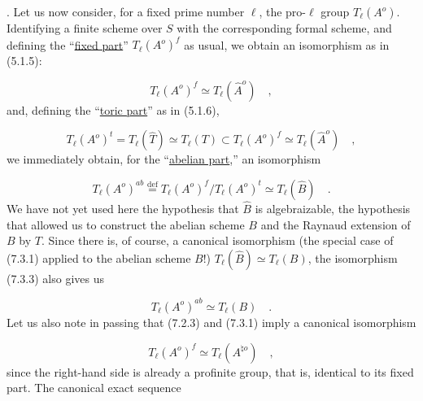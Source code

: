 
\medskip
{}. Let us now consider, for a fixed prime number $\ell$, the
pro-$\ell$ group $T_{\ell}(A^{o})$. Identifying a finite scheme over
$S$ with the corresponding formal scheme, and defining the
``\underline{fixed part}'' $T_{\ell}(A^{o})^{f}$ as usual, we obtain
an isomorphism as in (5.1.5):

\begin{equation}\tag{7.3.1}
T_{\ell}(A^{o})^{f} \simeq T_{\ell}(\widehat{A}^{o}) \quad ,
\end{equation}
and, defining the ``\underline{toric part}'' as in (5.1.6),

\begin{equation}\tag{7.3.2}
T_{\ell}(A^{o})^{t} = T_{\ell}(\widehat{T}) \simeq T_{\ell}(T)
 \subset T_{\ell}(A^{o})^{f} \simeq T_{\ell}(\widehat{A}^{o}) \quad ,
\end{equation}
we immediately obtain, for the ``\underline{abelian part},'' an
isomorphism

\begin{equation}\tag{7.3.3}
T_{\ell}(A^{o})^{ab} \stackrel{\mathrm{def}}{=}
T_{\ell}(A^{o})^{f}/T_{\ell}(A^{o})^{t}
 \simeq T_{\ell}(\widehat{B}) \quad .
\end{equation}
We have not yet used here the hypothesis that $\widehat B$ is
algebraizable, the hypothesis that allowed us to construct the
abelian scheme $B$ and the Raynaud extension of $B$ by $T$. Since
there is, of course, a canonical isomorphism (the special case of
(7.3.1) applied to the abelian scheme $B$!)
$T_{\ell}(\widehat B)\simeq T_{\ell}(B)$, the isomorphism (7.3.3)
also gives us

\begin{equation}\tag{7.3.4}
T_{\ell}(A^{o})^{ab} \simeq T_{\ell}(B) \quad .
\end{equation}
Let us also note in passing that (7.2.3) and (7.3.1) imply a canonical
isomorphism

\begin{equation}\tag{7.3.5}
T_{\ell}(A^{o})^{f} \simeq T_{\ell}(A^{\natural o}) \quad ,
\end{equation}
since the right-hand side is already a profinite group, that is,
identical to its fixed part. The canonical exact sequence

